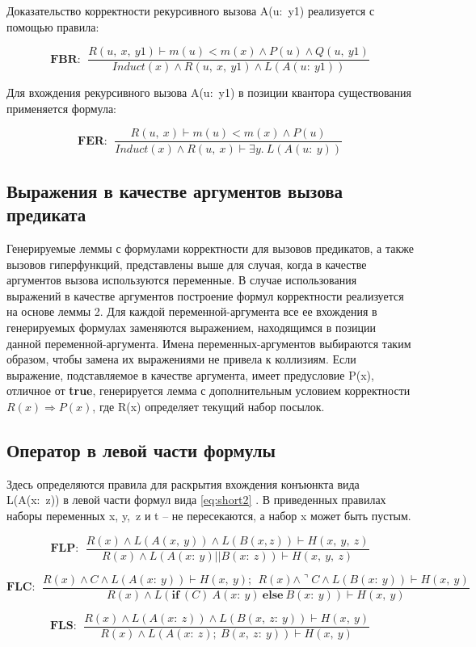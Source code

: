 \documentclass[10pt,a4paper]{article}
\newcommand{\ruleI}[3] {
$$
\mathbf{#1:} ~~
\frac{#2}{#3}
$$
}
\newcommand{\lnkformula}[1] {
\eqref{eq:#1}
}
\begin{document}
Доказательство корректности рекурсивного вызова A(u: y1) реализуется с помощью правила:

\ruleI{FBR}
{R(u,~x,~y1) \vdash m(u)<m(x) \land P(u) \land Q(u,~y1)}
{Induct(x) \land R(u,~x,~y1) \land L(A(u:~y1))}

Для вхождения рекурсивного вызова A(u: y1) в позиции квантора существования применяется формула:

\ruleI{FER}
{R(u,~x) \vdash m(u)<m(x) \land P(u)}
{Induct(x) \land R(u,~x) \vdash \exists y.~L(A(u:~y))}

\subsection{Выражения в качестве аргументов вызова предиката}

Генерируемые леммы с формулами корректности для вызовов предикатов, а также вызовов гиперфункций, представлены выше для случая, когда в качестве аргументов вызова используются переменные. В случае использования выражений в качестве аргументов построение формул корректности реализуется на основе леммы 2. Для каждой переменной-аргумента все ее вхождения в генерируемых формулах заменяются выражением, находящимся в позиции данной переменной-аргумента. Имена переменных-аргументов выбираются таким образом, чтобы замена их выражениями не привела к коллизиям. Если выражение, подставляемое в качестве аргумента, имеет предусловие P(x), отличное от \textbf{true}, генерируется лемма с дополнительным условием корректности $ R(x) \Rightarrow P(x) $, где R(x) определяет текущий набор посылок.

\subsection{Оператор в левой части формулы}
\label{ex:leftside}

Здесь определяются правила для раскрытия вхождения конъюнкта вида L(A(x: z)) в левой части формул вида \lnkformula{short2}. В приведенных правилах наборы переменных x, y, z и t – не пересекаются, а набор x может быть пустым.

\ruleI{FLP}
{R(x) \land L(A(x,~y)) \land L(B(x, z)) \vdash H(x,~y,~z)}
{R(x) \land L(A(x:~y)||B(x:~z)) \vdash H(x,~y,~z)}

\ruleI{FLC}
{R(x) \land C \land L(A(x:~y)) \vdash H(x,~y);~~R(x)\land \urcorner C \land L(B(x:~y)) \vdash H(x,~y)}
{R(x) \land L(\mathbf{if}~(C)~A(x:~y)~\mathbf{else}~B(x:~y))\vdash H(x,~y)}

\ruleI{FLS}
{R(x) \land L(A(x:~z)) \land L(B(x,~z:~y)) \vdash H(x,~y)}
{R(x) \land L(A(x:~z);~B(x,~z:~y)) \vdash H(x,~y)}
\end{document}
